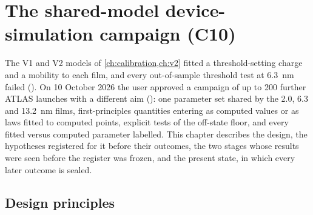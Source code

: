 \chapter{The shared-model device-simulation campaign (C10)}
\label{ch:mono-c10}

The V1 and V2 models of \cref{ch:calibration,ch:v2} fitted a threshold-setting charge and a mobility to each film, and
every out-of-sample threshold test at 6.3~nm failed (). On 10 October 2026 the user approved a campaign of
up to 200 further ATLAS launches with a different aim (): one parameter set shared by the 2.0, 6.3 and
13.2~nm films, first-principles quantities entering as computed values or as laws fitted to computed points, explicit
tests of the off-state floor, and every fitted versus computed parameter labelled. This chapter describes the design,
the hypotheses registered for it before their outcomes, the two stages whose results were seen before the register was
frozen, and the present state, in which every later outcome is sealed.

\section{Design principles}
\label{sec:mono-c10-design}

